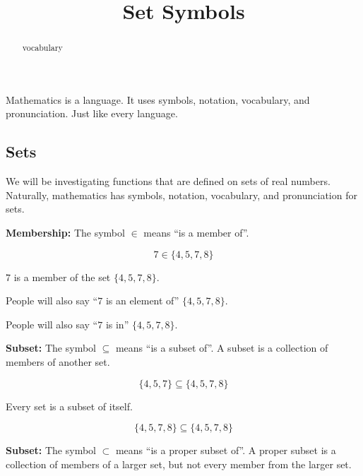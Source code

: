 \documentclass{ximera}
\title{Set Symbols}
\begin{document}
\begin{abstract}
vocabulary
\end{abstract}
\maketitle





Mathematics is a language.  It uses symbols, notation, vocabulary, and pronunciation. Just like every language.   




\subsection*{Sets}



We will be investigating functions that are defined on sets of real numbers. Naturally, mathematics has symbols, notation, vocabulary, and pronunciation for sets. 



\textbf{\textcolor{blue!55!black}{Membership:}}  The symbol $\in$ means ``is a member of''.


\[
7 \in \{ 4, 5, 7, 8 \}
\]

\begin{center}

$7$ is a member of the set $\{ 4, 5, 7, 8 \}$.

\end{center}

People will also say ``$7$ is an element of'' $\{ 4, 5, 7, 8 \}$. 

People will also say ``$7$ is in'' $\{ 4, 5, 7, 8 \}$. 



\textbf{\textcolor{blue!55!black}{Subset:}}  The symbol $\subseteq$ means ``is a subset of''.  A subset is a collection of members of another set.


\[
\{ 4, 5, 7 \} \subseteq \{ 4, 5, 7, 8 \}
\]


Every set is a subset of itself.


\[
\{ 4, 5, 7, 8 \} \subseteq \{ 4, 5, 7, 8 \}
\]





\textbf{\textcolor{blue!55!black}{Subset:}}  The symbol $\subset$ means ``is a proper subset of''. A proper subset is a collection of members of a larger set, but not every member from the larger set.
\end{document}
